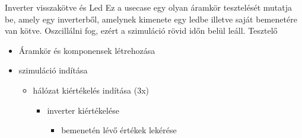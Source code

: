 \usecase
{Inverter visszakötve és Led}
{Ez a usecase egy olyan áramkör tesztelését mutatja be, amely egy inverterből, amelynek kimenete egy ledbe illetve saját bemenetére van kötve. Oszcillálni fog, ezért a szimuláció rövid időn belül leáll.}
{Tesztelő}
{\vspace{-15pt}
\begin{itemize}
\setlength{\itemsep}{0cm}%
\setlength{\parskip}{0cm}%
\item Áramkör és komponensek létrehozása
\item szimuláció indítása
\begin{itemize}
\setlength{\itemsep}{0cm}%
\setlength{\parskip}{0cm}%
\item hálózat kiértékelés indítása (3x)
\begin{itemize}
\setlength{\itemsep}{0cm}%
\setlength{\parskip}{0cm}%
\item inverter kiértékelése
\begin{itemize}
\setlength{\itemsep}{0cm}%
\setlength{\parskip}{0cm}%
\item bemenetén lévő értékek lekérése

\end{itemize}
\end{itemize}
\end{itemize}
\end{itemize}}
